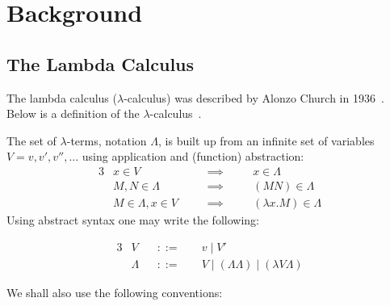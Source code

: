\chapter{Background}
\label{chap:technical}

\section{The Lambda Calculus}
\newcommand{\lcalc}{$\lambda$-calculus}
\newcommand{\lCalc}{$\lambda$-Calculus}
\newcommand{\fto}{\rightarrow}
The lambda calculus (\lcalc) was described by Alonzo Church in 1936~\cite{church1936unsolvable}. 
Below is a definition of the \lcalc~\cite{barendregt2013lambda}.

\begin{definition}[The \lcalc]
    The set of $\lambda$-terms, notation $\Lambda$, is built up from an infinite set of variables $V={v,v',v'',...}$  using application and (function) abstraction: 
    \begin{alignat*}{3}
    &x \in V                 \quad && \implies \quad && x \in \Lambda\\
    &M,N \in \Lambda         \quad && \implies \quad && (M N) \in \Lambda\\
    &M \in \Lambda, x\in V   \quad && \implies \quad && (\lambda x. M) \in \Lambda 
    \end{alignat*}
    Using abstract syntax one may write the following:
    
    \begin{alignat*}{3}
    &V       && ::= \; && v \mid V'\\
    &\Lambda && ::= \; && V \mid (\Lambda\Lambda) \mid (\lambda V\Lambda)
    \end{alignat*}
\end{definition}

We shall also use the following conventions:

